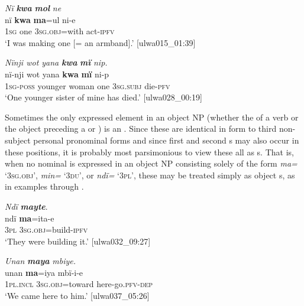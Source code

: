 \ea%
    \label{ex:det:67}
          \textit{Nï} \textbf{\textit{kwa}} \textbf{\textit{mol}} \textit{ne}\\
\gll    nï    \textbf{kwa}  \textbf{ma}=ul      ni-e\\
    1\textsc{sg}  one    3\textsc{sg.obj}=with  act-\textsc{ipfv}\\
\glt `I was making one [= an armband].’ [ulwa015\_01:39]
\z

\ea%
    \label{ex:det:68}
          \textit{Nïnji wot yana} \textbf{\textit{kwa}} \textbf{\textit{mï}} \textit{nip.}\\
\gll    nï-nji    wot      yana  \textbf{kwa}  \textbf{mï}       ni-p\\
    1\textsc{sg-poss}  younger  woman  one    3\textsc{sg.subj}  die-\textsc{pfv}\\
\glt `One younger sister of mine has died.’ [ulwa028\_00:19]
\z



Sometimes the only expressed element in an object NP (whether the  of a  verb or the object preceding a  or ) is an . Since these are identical in form to third  non-subject personal pronominal forms and since first  and second  s may also occur in these positions, it is probably most parsimonious to view these all as s. That is, when no nominal is expressed in an object NP consisting solely of the form \textit{ma=} ‘3\textsc{sg.obj}’, \textit{min=} ‘3\textsc{du}’, or \textit{ndï=} ‘3\textsc{pl}’, these may be treated simply as object s, as in examples  through .

\ea%
    \label{ex:det:69}
          \textit{Ndï} \textbf{\textit{mayte}}.\\
\gll ndï  \textbf{ma}=ita-e\\
    3\textsc{pl}  3\textsc{sg.obj}=build-\textsc{ipfv}\\
\glt `They were building it.’ [ulwa032\_09:27]
\z

\ea%
    \label{ex:det:70}
          \textit{Unan} \textbf{\textit{maya}} \textit{mbiye.}\\
\gll    unan    \textbf{ma}=iya      mbï-i-e\\
    1\textsc{pl.incl}  3\textsc{sg.obj}=toward  here-go.\textsc{pfv-dep}\\
\glt `We came here to him.’ [ulwa037\_05:26]
\z

